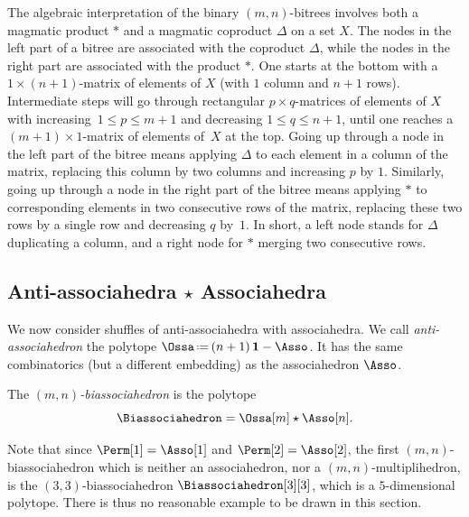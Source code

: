 \documentclass[AHL,Unicode,longabstracts,published]{cedram}
\renewcommand{\b}[1]{\boldsymbol{#1}}
\newcommand{\one}{\b{1}}
\newcommand{\eqdef}{\mbox{\,\raisebox{0.2ex}{\scriptsize\ensuremath{\mathrm:}}\ensuremath{=}\,}}
\newcommand{\shuffleDP}{\star} %
\begin{document}
\begin{rema}\label{rem:algebraicInterpretationBiassociahedra}
The algebraic interpretation of the binary $(m,n)$-bitrees involves both a magmatic product $\ast$ and a magmatic coproduct $\Delta$ on a set $X$. The nodes in the left part of a bitree are associated with the coproduct $\Delta$, while the nodes in the right part are associated with the product $\ast$. One starts at the bottom with a $1 \times (n+1)$-matrix of elements of $X$ (with $1$ column and $n+1$ rows). Intermediate steps will go through rectangular $p \times q$-matrices of elements of $X$ with increasing~$1 \leq p \leq m+1$ and decreasing $1 \leq q \leq n+1$, until one reaches a $(m+1) \times 1$-matrix of elements of~$X$ at the top. Going up through a node in the left part of the bitree means applying $\Delta$ to each element in a column of the matrix, replacing this column by two columns and increasing $p$ by $1$. Similarly, going up through a node in the right part of the bitree means applying $\ast$ to corresponding elements in two consecutive rows of the matrix, replacing these two rows by a single row and decreasing $q$ by~$1$. In short, a left node stands for $\Delta$ duplicating a column, and a right node for $\ast$ merging two consecutive rows.
\end{rema}



\subsection{Anti-associahedra \texorpdfstring{$\shuffleDP$}{shuffleDP} Associahedra}\label{subsec:biassociahedra}

We now consider shuffles of anti-associahedra with asso\-ciahedra. We call
\emph{anti-associahedron} the polytope $\Ossa \eqdef (n+1) \, \one - \Asso$. It has the same combinatorics (but a different embedding) as the associahedron $\Asso$.

\begin{defi}\label{def:biassociahedron}
The
\emph{$(m,n)$-biassociahedron} is the polytope
\[
\Biassociahedron = \Ossa[m] \shuffleDP \Asso[n].
\]
\end{defi}

Note that since $\Perm[1] = \Asso[1]$ and $\Perm[2] = \Asso[2]$, the first $(m,n)$-biassociahedron which is neither an associahedron, nor a $(m,n)$-multiplihedron, is the $(3,3)$-biassociahedron $\Biassociahedron[3][3]$, which is a $5$-dimensional polytope. There is thus no reasonable example to be drawn in this section.
\end{document}
